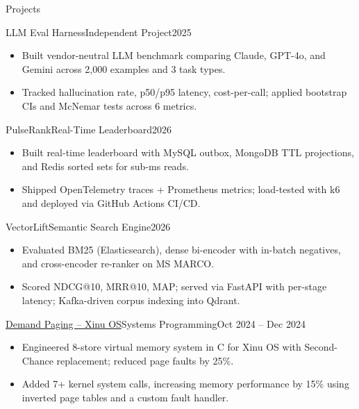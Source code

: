 \documentclass[]{mcdowellcv}
\begin{document}
\begin{cvsection}{Projects}
  \begin{cvsubsection}{LLM Eval Harness}{Independent Project}{2025}
    \begin{itemize}
      \item Built vendor-neutral LLM benchmark comparing Claude, GPT-4o, and Gemini across 2,000 examples and 3 task types.
      \item Tracked hallucination rate, p50/p95 latency, cost-per-call; applied bootstrap CIs and McNemar tests across 6 metrics.
    \end{itemize}
    \vspace{-1.5pt}
  \end{cvsubsection}

  \begin{cvsubsection}{PulseRank}{Real-Time Leaderboard}{2026}
    \begin{itemize}
      \item Built real-time leaderboard with MySQL outbox, MongoDB TTL projections, and Redis sorted sets for sub-ms reads.
      \item Shipped OpenTelemetry traces + Prometheus metrics; load-tested with k6 and deployed via GitHub Actions CI/CD.
    \end{itemize}
    \vspace{-1.5pt}
  \end{cvsubsection}

  \begin{cvsubsection}{VectorLift}{Semantic Search Engine}{2026}
    \begin{itemize}
      \item Evaluated BM25 (Elasticsearch), dense bi-encoder with in-batch negatives, and cross-encoder re-ranker on MS MARCO.
      \item Scored NDCG@10, MRR@10, MAP; served via FastAPI with per-stage latency; Kafka-driven corpus indexing into Qdrant.
    \end{itemize}
    \vspace{-1.5pt}
  \end{cvsubsection}

  \begin{cvsubsection}{\href{https://github.com/ncsu-csc-501/project3-mndedhia_akulka26_aapai}{Demand Paging -- Xinu OS}}{Systems Programming}{Oct 2024 -- Dec 2024}
    \begin{itemize}
      \item Engineered 8-store virtual memory system in C for Xinu OS with Second-Chance replacement; reduced page faults by 25\%.
      \item Added 7+ kernel system calls, increasing memory performance by 15\% using inverted page tables and a custom fault handler.
    \end{itemize}
  \end{cvsubsection}
\end{cvsection}
\end{document}
